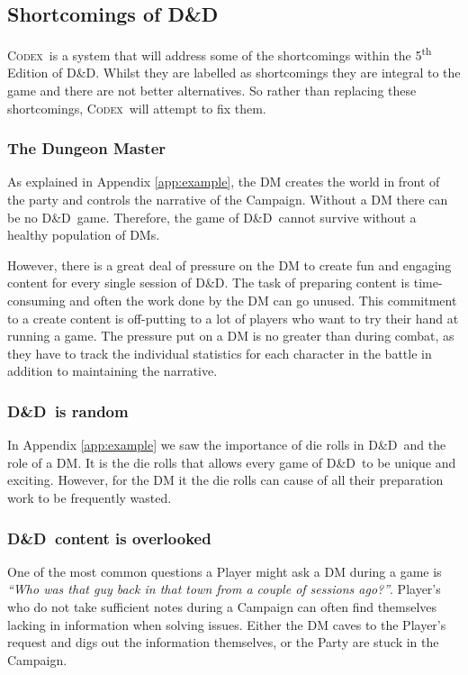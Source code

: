 \documentclass[progress]{cmpreport}
\newcommand{\dnd}{D\&D}
\newcommand{\Codex}{\textsc{Codex}}
\begin{document}
\begin{figure}
		\label{fig:DnDEquipmentExample}
	\end{figure}

	\subsection{Shortcomings of \dnd} \label{sec:shortcomings}
	\Codex \ is a system that will address some of the shortcomings within the 5\textsuperscript{th} Edition of \dnd. Whilst they are labelled as shortcomings they are integral to the game and there are not better alternatives. So rather than replacing these shortcomings, \Codex \ will attempt to fix them.
	
		\subsubsection{The Dungeon Master} \label{sec:DM}
		As explained in Appendix \ref{app:example}, the DM creates the world in front of the party and controls the narrative of the Campaign. Without a DM there can be no \dnd \ game. Therefore, the game of \dnd \ cannot survive without a healthy population of DMs.
		
		However, there is a great deal of pressure on the DM to create fun and engaging content for every single session of \dnd. The task of preparing content is time-consuming and often the work done by the DM can go unused. This commitment to a create content is off-putting to a lot of players who want to try their hand at running a game. The pressure put on a DM is no greater than during combat, as they have to track the individual statistics for each character in the battle in addition to maintaining the narrative.

		\subsubsection{\dnd \ is random} \label{sec:rand}
		In Appendix \ref{app:example} we saw the importance of die rolls in \dnd \ and the role of a DM. It is the die rolls that allows every game of \dnd \ to be unique and exciting. However, for the DM it the die rolls can cause of all their preparation work to be frequently wasted.
		
		\subsubsection{\dnd \ content is overlooked} \label{sec:overlooked}
		One of the most common questions a Player might ask a DM during a game is \emph{``Who was that guy back in that town from a couple of sessions ago?''}. Player's who do not take sufficient notes during a Campaign can often find themselves lacking in information when solving issues. Either the DM caves to the Player's request and digs out the information themselves, or the Party are stuck in the Campaign. 
\end{document}
